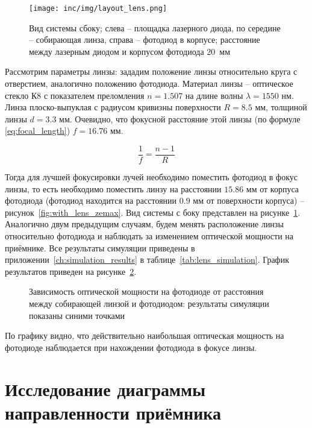\begin{figure}[!h]
    \centering
    \texttt{[image: inc/img/layout\_lens.png]}
    \caption{Вид системы сбоку; слева \--- площадка лазерного диода, по середине \--- собирающая линза, справа \--- фотодиод в корпусе; расстояние между лазерным диодом и корпусом фотодиода 20~мм}
    \label{fig:layout_lens}
\end{figure}


Рассмотрим параметры линзы: зададим положение линзы относительно круга с отверстием, аналогично положению фотодиода. Материал линзы \--- оптическое стекло К8 с показателем преломления $n = 1.507$ на длине волны $\lambda = 1550$ нм. Линза плоско-выпуклая с радиусом кривизны поверхности $R = 8.5$ мм, толщиной линзы $d = 3.3$ мм. Очевидно, что фокусной расстояние этой линзы (по формуле \eqref{eq:focal_length}) $f = 16.76$ мм. 

\begin{equation}
    \frac{1}{f} = \frac{n-1}{R}
    \label{eq:focal_length}
\end{equation}

Тогда для лучшей фокусировки лучей необходимо поместить фотодиод в фокус линзы, то есть необходимо поместить линзу на расстоянии $15.86$ мм от корпуса фотодиода (фотодиод находится на расстоянии $0.9$ мм от поверхности корпуса) \--- рисунок~\ref{fig:with_lens_zemax}. Вид системы с боку представлен на рисунке~\ref{fig:layout_lens}. Аналогично двум предыдущим случаям, будем менять расположение линзы относительно фотодиода и наблюдать за изменением оптической мощности на приёмнике. Все результаты симуляции приведены в приложении~\ref{ch:simulation_results} в таблице~\ref{tab:lens_simulation}. График результатов приведен на рисунке~\ref{fig:lens_plot}.

\begin{figure}[h]
    \centering
    
    \caption{Зависимость оптической мощности на фотодиоде от расстояния между собирающей линзой и фотодиодом: результаты симуляции показаны синими точками}
    \label{fig:lens_plot}
\end{figure}

По графику видно, что действительно наибольшая оптическая мощность на фотодиоде наблюдается при нахождении фотодиода в фокусе линзы. 

\section{Исследование диаграммы направленности приёмника}

